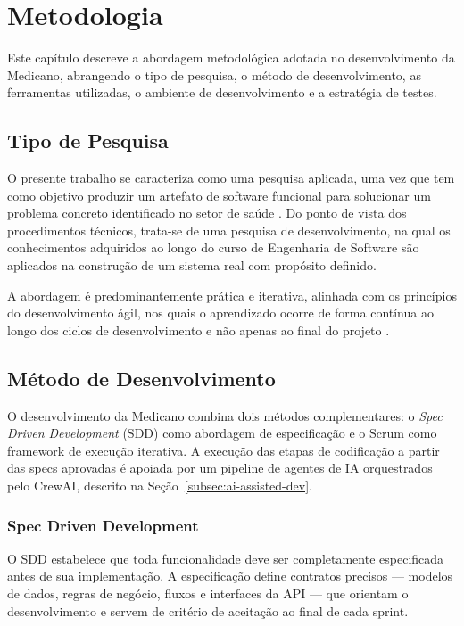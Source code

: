 \chapter{Metodologia}
\label{chap:methodology}

Este capítulo descreve a abordagem metodológica adotada
no desenvolvimento da Medicano, abrangendo o tipo de
pesquisa, o método de desenvolvimento, as ferramentas
utilizadas, o ambiente de desenvolvimento e a estratégia
de testes.

\section{Tipo de Pesquisa}
\label{sec:research-type}

O presente trabalho se caracteriza como uma pesquisa
aplicada, uma vez que tem como objetivo produzir um
artefato de software funcional para solucionar um
problema concreto identificado no setor de saúde
\cite{gil2002}. Do ponto de vista dos procedimentos
técnicos, trata-se de uma pesquisa de desenvolvimento,
na qual os conhecimentos adquiridos ao longo do curso
de Engenharia de Software são aplicados na construção
de um sistema real com propósito definido.

A abordagem é predominantemente prática e iterativa,
alinhada com os princípios do desenvolvimento ágil,
nos quais o aprendizado ocorre de forma contínua ao
longo dos ciclos de desenvolvimento e não apenas ao
final do projeto \cite{schwaber2020}.

\section{Método de Desenvolvimento}
\label{sec:dev-method}

O desenvolvimento da Medicano combina dois métodos
complementares: o \textit{Spec Driven Development}
(SDD) como abordagem de especificação e o Scrum como
framework de execução iterativa. A execução das etapas
de codificação a partir das specs aprovadas é apoiada
por um pipeline de agentes de IA orquestrados pelo
CrewAI, descrito na Seção~\ref{subsec:ai-assisted-dev}.

\subsection{Spec Driven Development}
\label{subsec:sdd}

O SDD estabelece que toda funcionalidade deve ser
completamente especificada antes de sua implementação.
A especificação define contratos precisos — modelos
de dados, regras de negócio, fluxos e interfaces da
API — que orientam o desenvolvimento e servem de
critério de aceitação ao final de cada sprint.

